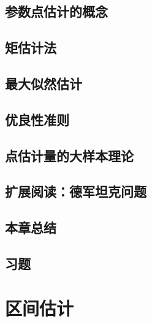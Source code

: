 \documentclass[UTF8,12pt,a4paper,fontset=fandol]{ctexbook}
\begin{document}
\section{参数点估计的概念}
\label{sec:study-point-estimation-concept}

\section{矩估计法}
\label{sec:study-method-of-moments}

\section{最大似然估计}
\label{sec:study-maximum-likelihood}

\section{优良性准则}
\label{sec:study-estimator-criteria}

\section{点估计量的大样本理论}
\label{sec:study-estimator-asymptotics}

\section{扩展阅读：德军坦克问题}
\label{sec:study-german-tank}

\section*{本章总结}

\section*{习题}

\chapter{区间估计}
\label{chap:study-interval-estimation}
\end{document}
